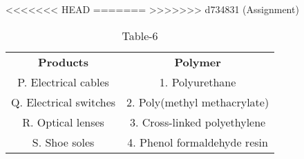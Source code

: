 \begin{table}[htbp]
  \centering
  \caption{Table-6}
<<<<<<< HEAD
  \label{tab:tables/table6.tex}
=======
  \label{table6}
>>>>>>> d734831 (Assignment)
  \begin{tabular}{cc}
\textbf{Products} & \textbf{Polymer}\\

P. Electrical cables & 1. Polyurethane \\
Q. Electrical switches & 2. Poly(methyl methacrylate) \\
R. Optical lenses & 3. Cross-linked polyethylene \\
S. Shoe soles & 4. Phenol formaldehyde resin \\
  
  
  
  \end{tabular}
\end{table}